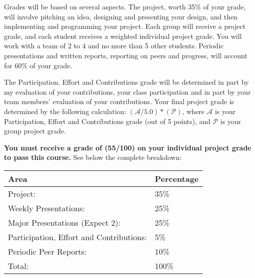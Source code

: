 Grades will be based on several aspects.
The project, worth 35\% of your grade, will involve pitching an idea, designing and presenting your design, and then implementing and programming your project. Each group will receive a project grade, and each student receives a weighted individual project grade.
You will work with a team of 2 to 4 and no more than 5 other students.
Periodic presentations and written reports, reporting on peers and progress, will account for 60\% of your grade.

The Participation, Effort and Contributions grade will be determined in part by my evaluation of your contributions, your class participation and in part by your team members' evaluation of your contributions.
Your final project grade is determined by the following calculation: $(\mathcal{A}/5.0)*(\mathcal{P})$, where $\mathcal{A}$ is your Participation, Effort and Contributions grade (out of 5 points), and $\mathcal{P}$ is your group project grade.

\textbf{You must receive a grade of (55/100) on your individual project grade to pass this course.} See below the complete breakdown:

\par\vspace{1cm}
\begin{tabular}{ @{}ll@{} }
    \toprule
        Area & Percentage \\
    \midrule
        Project: & 35\% \\
        Weekly Presentations: & 25\% \\
        Major Presentations (Expect 2): & 25\% \\
        Participation, Effort and Contributions: & 5\% \\
        Periodic Peer Reports: & 10\% \\
        Total: & 100\% \\
    \bottomrule
\end{tabular}
